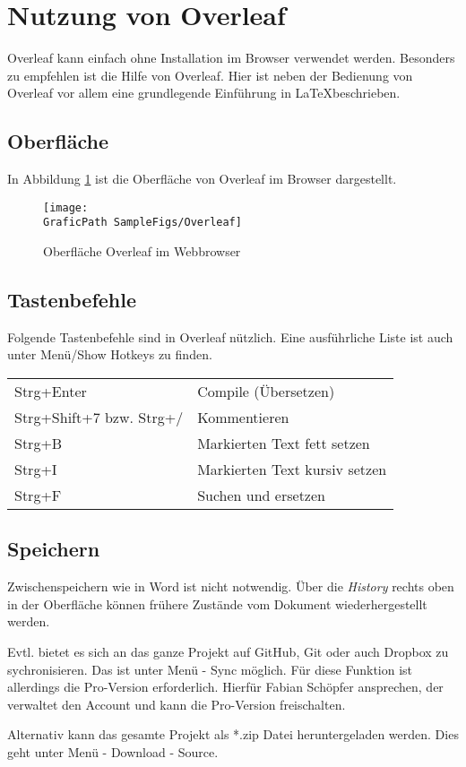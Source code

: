 \section{Nutzung von Overleaf}
%
Overleaf kann einfach ohne Installation im Browser verwendet werden.
Besonders zu empfehlen ist die Hilfe von Overleaf.
Hier ist neben der Bedienung von Overleaf vor allem eine grundlegende Einführung in \LaTeX beschrieben.
%
\subsection{Oberfläche}
In Abbildung \ref{fig:Overleaf} ist die Oberfläche von Overleaf im Browser dargestellt.
%
\begin{figure}[bht]
\texttt{[image: \\GraficPath SampleFigs/Overleaf]}
\caption{Oberfläche Overleaf im Webbrowser}
\label{fig:Overleaf}
\end{figure}
%
\subsection{Tastenbefehle}
Folgende Tastenbefehle sind in Overleaf nützlich. Eine ausführliche Liste ist auch unter Menü/Show Hotkeys zu finden.
\par
%
\begin{tabular}{ll}
Strg+Enter                  & Compile (Übersetzen)\\
Strg+Shift+7 bzw. Strg+/    & Kommentieren\\
Strg+B                      & Markierten Text fett setzen\\
Strg+I                      & Markierten Text kursiv setzen\\
Strg+F                      & Suchen und ersetzen
\end{tabular}
%
\subsection{Speichern}
Zwischenspeichern wie in Word ist nicht notwendig.
Über die \textit{History} rechts oben in der Oberfläche können frühere Zustände vom Dokument wiederhergestellt werden.
\par
Evtl. bietet es sich an das ganze Projekt auf GitHub, Git oder auch Dropbox zu sychronisieren.
Das ist unter Menü - Sync möglich. 
Für diese Funktion ist allerdings die Pro-Version erforderlich.
Hierfür Fabian Schöpfer ansprechen, der verwaltet den Account und kann die Pro-Version freischalten.
\par
Alternativ kann das gesamte Projekt als *.zip Datei heruntergeladen werden.
Dies geht unter Menü - Download - Source.